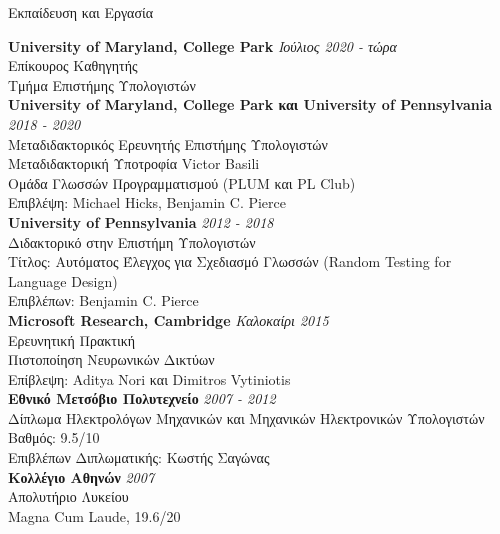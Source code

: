 \documentclass{resume} %
\begin{document}

\newcommand{\edu}[4]{
  {\bf #3} \hfill {\em #2}\\
  {#1}\\
  #4\\
}

\begin{rSection}{\textgreek{Εκπαίδευση και Εργασία}}

\edu{\textgreek{Επίκουρος Καθηγητής}}{\textgreek{Ιούλιος 2020 - τώρα}}
    {University of Maryland, College Park}
    {\textgreek{Τμήμα Επιστήμης Υπολογιστών}}
  
\edu{\textgreek{Μεταδιδακτορικός Ερευνητής Επιστήμης Υπολογιστών}}{2018 - 2020}
    {University of Maryland, College Park \textgreek{και} University of Pennsylvania}{
      \textgreek{Μεταδιδακτορική Υποτροφία} Victor Basili\\
      \textgreek{Ομάδα Γλωσσών Προγραμματισμού} (PLUM \textgreek{και} PL Club)\\
      \textgreek{Επιβλέψη: }Michael Hicks, Benjamin C. Pierce
    }

\edu{\textgreek{Διδακτορικό στην Επιστήμη Υπολογιστών}}{2012 - 2018}
    {University of Pennsylvania}{
      \textgreek{Τίτλος: Αυτόματος Έλεγχος για Σχεδιασμό Γλωσσών} (Random Testing for Language Design)\\
      \textgreek{Επιβλέπων: } Benjamin C. Pierce
    }
    
\edu{\textgreek{Ερευνητική Πρακτική}}{\textgreek{Καλοκαίρι} 2015}
    {Microsoft Research, Cambridge}{
      \textgreek{Πιστοποίηση Νευρωνικών Δικτύων}\\
      \textgreek{Επίβλεψη:} Aditya Nori \textgreek{και} Dimitros Vytiniotis
    }

\edu{\textgreek{Δίπλωμα Ηλεκτρολόγων Μηχανικών και Μηχανικών Ηλεκτρονικών Υπολογιστών}}{2007 - 2012}
    {\textgreek{Εθνικό Μετσόβιο Πολυτεχνείο}}
    {
      \textgreek{Βαθμός}: 9.5/10\\
      \textgreek{Επιβλέπων Διπλωματικής: Κωστής Σαγώνας}
     }

\edu{\textgreek{Απολυτήριο Λυκείου}}{2007}
    {\textgreek{Κολλέγιο Αθηνών}}
    {Magna Cum Laude, 19.6/20}
    
\end{rSection}
\end{document}
